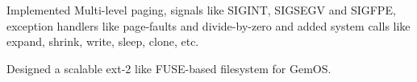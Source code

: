\documentclass[a4paper]{deedy-resume-reversed}
\begin{document}
\begin{minipage}[t]{0.60\textwidth}
\begin{tightemize}
    \item Implemented Multi-level paging, signals like SIGINT, SIGSEGV and SIGFPE, exception handlers like page-faults and divide-by-zero and added system calls like expand, shrink, write, sleep, clone, etc.
    \item Designed a scalable ext-2 like FUSE-based filesystem for GemOS.
\end{tightemize}
\sectionsep







\end{minipage}
\end{document}
